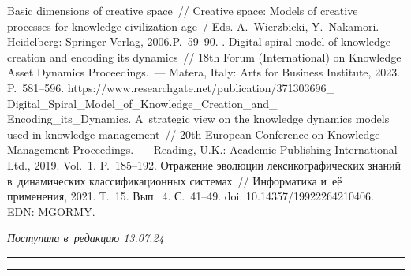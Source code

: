 \begin{multicols}{2}
{{\begin{thebibliography}{99}
 Basic dimensions of creative space~// Creative space: Models of 
creative processes for knowledge civilization age~/ Eds. A.~Wierzbicki, Y.~Nakamori.~--- 
Heidelberg: Springer Verlag, 2006.\linebreak P.~59--90.
. Digital spiral model of knowledge creation and encoding its dynamics~// 18th 
Forum (International) on Knowledge Asset Dynamics Proceedings.~--- Matera, Italy: Arts for 
Business Institute, 2023. P.~581--596. {\sf  
https://www.researchgate.net/publication/371303696\_ Digital\_Spiral\_Model\_of\_Knowledge\_Creation\_and\_ Encoding\_its\_Dynamics}.
 A~strategic view on the knowledge dynamics models used in knowledge 
management~// 20th European Conference on Knowledge Management Proceedings.~---  Reading, 
U.K.: Academic Publishing International Ltd., 2019. Vol.~1. P.~185--192.
 Отражение 
эволюции лексикографических знаний в~динамических классификационных сис\-те\-мах~// 
Информатика и~её применения, 2021. Т.~15. Вып.~4. С.~41--49. doi: 10.14357/19922264210406. 
EDN: MGORMY.


\end{thebibliography}

 }
 }

\end{multicols}

\vspace*{-6pt}

\hfill{\small\textit{Поступила в~редакцию 13.07.24}}

\vspace*{6pt}




\hrule

\vspace*{2pt}

\hrule


\def\tit{A MODEL FOR~EXTRACTING KNOWLEDGE FROM PARALLEL TEXTS OF~A~LEXICOGRAPHIC 
INFORMATION SYSTEM}


\def\titkol{A model for~extracting knowledge from parallel texts of~a~lexicographic 
information system}


\def\aut{D.\,O.~Dobrovol'skij$^{1,2,3}$ and~I.\,M.~Zatsman$^3$}

